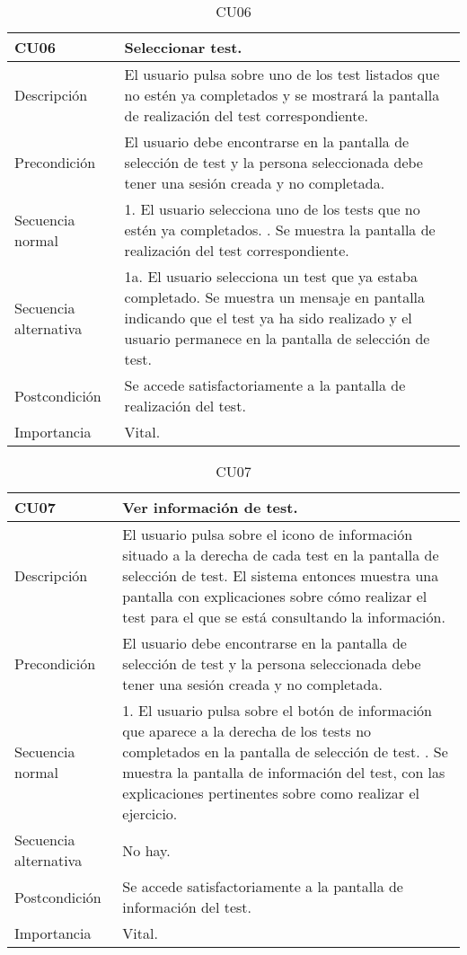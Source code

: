 \begin{table}[H]
\label{CU06}
\begin{center}
\begin{tabular}{| l | p{10cm} |}
\hline
CU06 & Seleccionar test.\\
\hline
Descripción & El usuario pulsa sobre uno de los test listados que no estén ya completados y se mostrará la pantalla de realización del test correspondiente.\\
\hline
Precondición & El usuario debe encontrarse en la pantalla de selección de test y la persona seleccionada debe tener una sesión creada y no completada.\\
\hline
Secuencia normal & 1. El usuario selecciona uno de los tests que no estén ya completados.
\newline 2. Se muestra la pantalla de realización del test correspondiente.\\
\hline
Secuencia alternativa & 1a. El usuario selecciona un test que ya estaba completado. Se muestra un mensaje en pantalla indicando que el test ya ha sido realizado y el usuario permanece en la pantalla de selección de test.\\
\hline
Postcondición & Se accede satisfactoriamente a la pantalla de realización del test.\\
\hline
Importancia & Vital.\\
\hline
\end{tabular}
\end{center}
\caption{CU06}
\end{table}

\begin{table}[H]
\label{CU07}
\begin{center}
\begin{tabular}{| l | p{10cm} |}
\hline
CU07 & Ver información de test.\\
\hline
Descripción & El usuario pulsa sobre el icono de información situado a la derecha de cada test en la pantalla de selección de test. El sistema entonces muestra una pantalla con explicaciones sobre cómo realizar el test para el que se está consultando la información.\\
\hline
Precondición & El usuario debe encontrarse en la pantalla de selección de test y la persona seleccionada debe tener una sesión creada y no completada.\\
\hline
Secuencia normal & 1. El usuario pulsa sobre el botón de información que aparece a la derecha de los tests no completados en la pantalla de selección de test.
\newline 2. Se muestra la pantalla de información del test, con las explicaciones pertinentes sobre como realizar el ejercicio.\\
\hline
Secuencia alternativa & No hay.\\
\hline
Postcondición & Se accede satisfactoriamente a la pantalla de información del test.\\
\hline
Importancia & Vital.\\
\hline
\end{tabular}
\end{center}
\caption{CU07}
\end{table}

